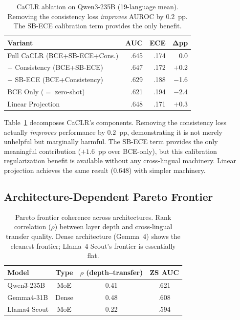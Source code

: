 \documentclass[11pt,a4paper]{article}
\begin{document}
\begin{table}[t]
\centering
\small
\begin{tabular}{lrrr}
\toprule
\textbf{Variant} & \textbf{AUC} & \textbf{ECE} & $\boldsymbol{\Delta}$\textbf{pp} \\
\midrule
Full CaCLR (BCE+SB-ECE+Cons.) & .645 & .174 & 0.0 \\
$-$ Consistency (BCE+SB-ECE)   & .647 & .172 & $+$0.2 \\
$-$ SB-ECE (BCE+Consistency)   & .629 & .188 & $-$1.6 \\
BCE Only ($=$ zero-shot)       & .621 & .194 & $-$2.4 \\
\midrule
Linear Projection              & .648 & .171 & $+$0.3 \\
\bottomrule
\end{tabular}
\caption{CaCLR ablation on Qwen3-235B (19-language mean). Removing the consistency loss \emph{improves} AUROC by $0.2$~pp. The SB-ECE calibration term provides the only benefit.}
\label{tab:caclr_ablation}
\end{table}

Table~\ref{tab:caclr_ablation} decomposes CaCLR's components.
Removing the consistency loss actually \emph{improves} performance by $0.2$~pp, demonstrating it is not merely unhelpful but marginally harmful.
The SB-ECE term provides the only meaningful contribution ($+1.6$~pp over BCE-only), but this calibration regularization benefit is available without any cross-lingual machinery.
Linear projection achieves the same result ($0.648$) with simpler machinery.

\subsection{Architecture-Dependent Pareto Frontier}

\begin{table}[t]
\centering
\small
\begin{tabular}{lccc}
\toprule
\textbf{Model} & \textbf{Type} & \textbf{$\rho$ (depth--transfer)} & \textbf{ZS AUC} \\
\midrule
Qwen3-235B  & MoE   & 0.41 & .621 \\
Gemma4-31B  & Dense & 0.48 & .608 \\
Llama4-Scout & MoE   & 0.22 & .594 \\
\bottomrule
\end{tabular}
\caption{Pareto frontier coherence across architectures. Rank correlation ($\rho$) between layer depth and cross-lingual transfer quality. Dense architecture (Gemma~4) shows the cleanest frontier; Llama~4 Scout's frontier is essentially flat.}
\label{tab:pareto_arch}
\end{table}
\end{document}
